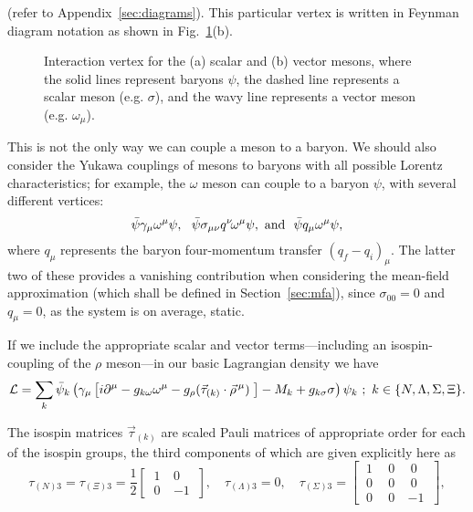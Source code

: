 \documentclass[11pt,a4paper,twoside]{carrollthesis}
\newcommand{\be}{\begin{equation}}
\newcommand{\ee}{\end{equation}}
\newcommand{\del}{\partial}
\newcommand{\s}{\sigma}
\newcommand{\w}{\omega}
\newcommand{\reci}[1]{\frac{1}{#1}}
\newcommand{\emdash}{\hspace{1pt}---\hspace{1pt}}
\begin{document}
(refer to Appendix~\ref{sec:diagrams}). This particular vertex is
written in Feynman diagram notation as shown in
Fig.~\ref{fig:vectorvertex}(b).\par
%
\begin{figure}[!b]
\caption[Baryon-meson vertices]{Interaction vertex for the (a) scalar
  and (b) vector mesons, where the solid lines represent baryons
  $\psi$, the dashed line represents a scalar meson (e.g. $\s$), and
  the wavy line represents a vector meson (e.g. $\omega_\mu$).
  \protect\label{fig:vectorvertex}}
\end{figure}
%
This is not the only way we can couple a meson to a baryon. We should
also consider the Yukawa couplings of mesons to baryons with all
possible Lorentz characteristics; for example, the $\omega$ meson can
couple to a baryon $\psi$, with several different vertices:
%
\be \bar{\psi}\gamma_\mu\omega^\mu\psi,\ \ \bar{\psi}\s_{\mu\nu}q^\nu \!
\omega^\mu\psi,\ {\rm and}\ \ \bar{\psi}q_\mu\omega^\mu\psi, \ee
%
where $q_\mu$ represents the baryon four-momentum transfer $(q_f -
q_i)_\mu$. The latter two of these provides a vanishing contribution
when considering the mean-field approximation (which shall be defined
in Section~\ref{sec:mfa}), since $\s_{00}= 0$ and $q_\mu = 0$, as the
system is on average, static.\par
%
If we include the appropriate scalar and vector terms\emdash including
an isospin-coupling of the $\rho$ meson\emdash in our basic Lagrangian
density we have
%
\be \label{eq:interL} {\cal L} = \sum_{k}
\bar{\psi}_k\left(\gamma_\mu\left[i\del^\mu-g_{k \w}\w^\mu
  -g_{\rho}(\vec{\tau}_{(k)}\cdot\vec{\rho}^{\, \mu})\; \right]
-M_k+g_{k\s}\s\right)\psi_k \ ; \ k \in\{N,\Lambda,\Sigma,\Xi\}.  \ee
%
\par
%
The isospin matrices $\vec{\tau}_{(k)}$ are scaled Pauli matrices of
appropriate order for each of the isospin groups, the third components
of which are given explicitly here as
%
\be \label{eq:taus} \tau_{(N)3} = \tau_{(\Xi)3} = \reci{2}
\left[ \begin{matrix}\ 1\ & 0\ \\\ 0\ & -1\ \end{matrix} \right],
\quad
\tau_{(\Lambda)3} = 0, \quad \tau_{(\Sigma)3} =
\left[ \begin{matrix}\ 1\ &\ 0\ &\ 0\ \\\ 0\ &\ 0\ &\ 0\ \\\ 0\ &\ 0\ &
    -1\ \end{matrix} \right], \ee
\end{document}

